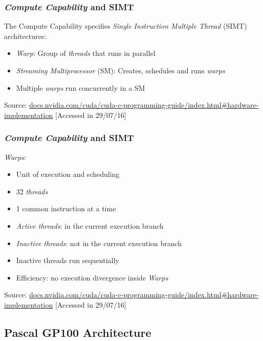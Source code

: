 \documentclass[10pt, compress]{beamer}
\begin{document}
\begin{frame}
    \frametitle{\textit{Compute Capability} and SIMT}
    The \alert{Compute Capability} specifies \textit{Single Instruction
    Multiple Thread} (SIMT) architectures:
    \pause
    \begin{itemize}
        \item \textit{Warp}: Group of \textit{threads} that runs in \alert{parallel}
        \item \textit{Streaming Multiprocessor} (SM): Creates, schedules and runs \textit{warps}
            \pause
        \item Multiple \textit{warps} run \alert{concurrently} in a SM
    \end{itemize}
    \vfill

    \begin{center}
        \tiny{Source: \url{docs.nvidia.com/cuda/cuda-c-programming-guide/index.html\#hardware-implementation} [Accessed in 29/07/16]}
    \end{center}
\end{frame}

\begin{frame}
    \frametitle{\textit{Compute Capability} and SIMT}
    \textit{Warps}:
    \pause
    \begin{itemize}
        \item Unit of execution and scheduling
        \item 32 \textit{threads}
            \pause
        \item 1 \alert{common instruction} at a time
            \pause
        \item \textit{Active threads}: in the current execution branch
        \item \textit{Inactive threads}: \alert{not} in the current execution branch
            \pause
        \item Inactive threads run \alert{sequentially}
            \pause
        \item Efficiency: no execution divergence inside \textit{Warps}
    \end{itemize}
    \vfill

    \begin{center}
        \tiny{Source: \url{docs.nvidia.com/cuda/cuda-c-programming-guide/index.html\#hardware-implementation} [Accessed in 29/07/16]}
    \end{center}
\end{frame}

\subsection{Pascal GP100 Architecture}
\end{document}
